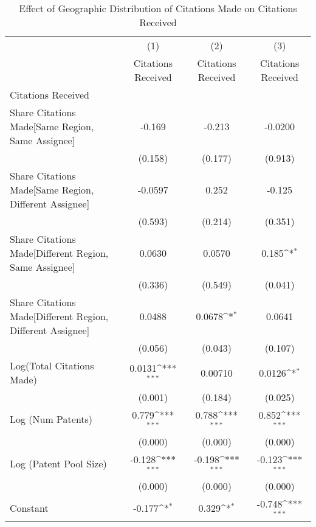 {
\def\sym#1{\ifmmode^{#1}\else\(^{#1}\)\fi}
\begin{longtable}{l*{3}{c}}
\caption{Effect of Geographic Distribution of Citations Made on Citations Received \label{model152}}\\
\hline\hline\endfirsthead\hline\endhead\hline\endfoot\endlastfoot
                &\multicolumn{1}{c}{(1)}&\multicolumn{1}{c}{(2)}&\multicolumn{1}{c}{(3)}\\
                &\multicolumn{1}{c}{Citations Received}&\multicolumn{1}{c}{Citations Received}&\multicolumn{1}{c}{Citations Received}\\
\hline
Citations Received&                  &                  &                  \\
Share Citations Made[Same Region, Same Assignee]&   -0.169         &   -0.213         &  -0.0200         \\
                &  (0.158)         &  (0.177)         &  (0.913)         \\
Share Citations Made[Same Region, Different Assignee]&  -0.0597         &    0.252         &   -0.125         \\
                &  (0.593)         &  (0.214)         &  (0.351)         \\
Share Citations Made[Different Region, Same Assignee]&   0.0630         &   0.0570         &    0.185\sym{*}  \\
                &  (0.336)         &  (0.549)         &  (0.041)         \\
Share Citations Made[Different Region, Different Assignee]&   0.0488         &   0.0678\sym{*}  &   0.0641         \\
                &  (0.056)         &  (0.043)         &  (0.107)         \\
Log(Total Citations Made)&   0.0131\sym{***}&  0.00710         &   0.0126\sym{*}  \\
                &  (0.001)         &  (0.184)         &  (0.025)         \\
Log (Num Patents)&    0.779\sym{***}&    0.788\sym{***}&    0.852\sym{***}\\
                &  (0.000)         &  (0.000)         &  (0.000)         \\
Log (Patent Pool Size)&   -0.128\sym{***}&   -0.198\sym{***}&   -0.123\sym{***}\\
                &  (0.000)         &  (0.000)         &  (0.000)         \\
Constant        &   -0.177\sym{*}  &    0.329\sym{*}  &   -0.748\sym{***}\\

\end{longtable}}
